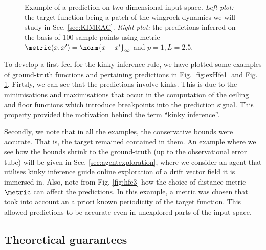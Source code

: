 \begin{figure}
        \centering
	 
	\label{fig:exHfe2}
   \caption{Example of a prediction on two-dimensional input space. \textit{Left plot:} the target function being a patch of the wingrock dynamics we will study in Sec. \ref{sec:KIMRAC}. \textit{Right plot:} the predictions inferred on the basis of 100 sample points using metric $\metric(x,x') = \norm{x-x'}_\infty$ and $p=1, L=2.5$.}
\end{figure}	 

To develop a first feel for the kinky inference rule, we have plotted some examples of ground-truth functions and pertaining predictions in Fig. \ref{fig:exHfe1} and Fig. \ref{fig:exHfe2}. Firtsly, we can see that the predictions involve kinks. This is due to the minimisations and maximisations that occur in the computation of the ceiling and floor functions which introduce breakpoints into the prediction signal. This property provided the motivation behind the term ``kinky inference''.

Secondly, we note that in all the examples, the conservative bounds were accurate. That is, the target remained contained in them. An example where we see how the bounds shrink to the ground-truth (up to the observational error tube) will be given in Sec. \ref{sec:agentexploration}, where we consider an agent that utilises kinky inference guide online exploration of a drift vector field it is immersed in. Also, note from Fig. \ref{fig:hfe3} how the choice of distance metric $\metric$ can affect the predictions. In this example, a metric was chosen that took into account an a priori known periodicity of the target function. This allowed predictions to be accurate even in unexplored parts of the input space. 


\subsection{Theoretical guarantees}


